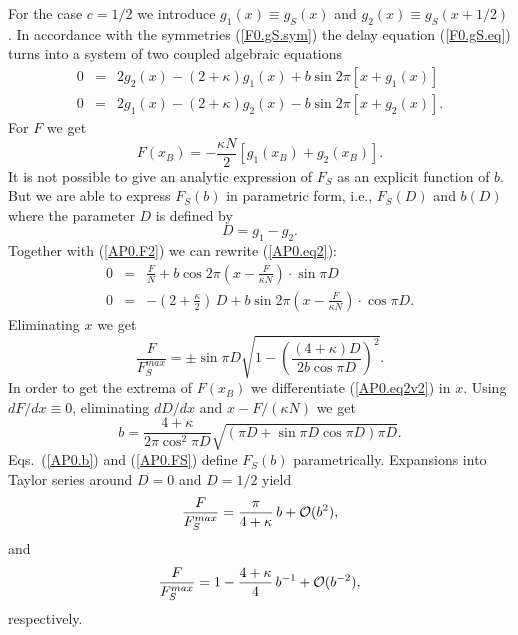 For the case $c=1/2$ we introduce $g_1(x)\equiv g_S(x)$ and $g_2(x)
\equiv g_S(x+1/2)$. In accordance with the symmetries
(\ref{F0.gS.sym}) the delay equation (\ref{F0.gS.eq}) turns into a
system of two coupled algebraic equations 
\begin{equation}\begin{array}{rcl}
  0&=&2g_2(x)-(2+\kappa)g_1(x)+b\sin 2\pi[x+g_1(x)]\\
  0&=&2g_1(x)-(2+\kappa)g_2(x)-b\sin 2\pi[x+g_2(x)].
\end{array}
\label{AP0.eq2}
\end{equation}
For $F$ we get
\begin{equation}
  F(x_B)=-\frac{\kappa N}{2}[g_1(x_B)+g_2(x_B)].
  \label{AP0.F2}
\end{equation}
It is not possible to give an analytic expression of $F_S$ as an 
explicit function of $b$. But we are able to express $F_S(b)$ in 
parametric form, i.e., $F_S(D)$ and $b(D)$ where the parameter $D$ is
defined by
\begin{equation}
  D=g_1-g_2.
  \label{AP0.D}
\end{equation}
Together with (\ref{AP0.F2}) we can rewrite (\ref{AP0.eq2}):
\begin{equation}\begin{array}{rcl}
  0&=&\frac{F}{N}+b\cos 2\pi\left(x-\frac{F}{\kappa N}\right)\cdot
	\sin \pi D\\
  0&=&-\left(2+\frac{\kappa}{2}\right)\,D+b\sin 2\pi\left(x-\frac{F}
	{\kappa N}\right)\cdot\cos \pi D.
\end{array}
\label{AP0.eq2v2}
\end{equation}
Eliminating $x$ we get
\begin{equation}
  \frac{F}{F_S^{max}}=\pm\sin\pi D\sqrt{1-\left(\frac{(4+\kappa)D}
	{2b\cos\pi D}\right)^2}.
  \label{AP0.FS}
\end{equation}
In order to get the extrema of $F(x_B)$ we differentiate
(\ref{AP0.eq2v2}) in $x$. Using $dF/dx\equiv 0$, eliminating $dD/dx$
and $x-F/(\kappa N)$ we get
\begin{equation}
  b=\frac{4+\kappa}{2\pi\cos^2\pi D}\sqrt{(\pi D+\sin\pi D
   \cos\pi D)\pi D}.
  \label{AP0.b}
\end{equation}
Eqs.~(\ref{AP0.b}) and (\ref{AP0.FS}) define $F_S(b)$ parametrically.
Expansions into Taylor series around $D=0$ and $D=1/2$ yield
\begin{equation}
  \frac{F}{F_S^{max}}=\frac{\pi}{4+\kappa}\,b+{\cal O}(b^2),
  \label{AP0.FS.b0}
\end{equation}
and
\begin{equation}
  \frac{F}{F_S^{max}}=1-\frac{4+\kappa}{4}\,b^{-1}+{\cal O}(b^{-2}),
  \label{AP0.FS.bi}
\end{equation}
respectively.

